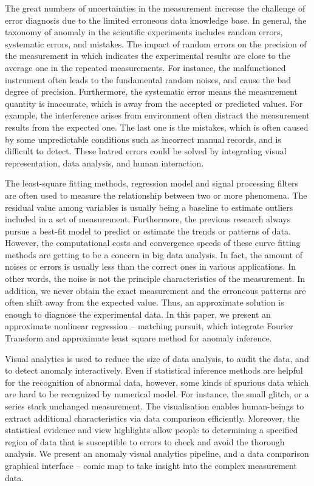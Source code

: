 \documentclass{vgtc}                          %
\begin{document}
	The great numbers of uncertainties in the measurement increase the challenge of error diagnosis due to the limited erroneous data knowledge base. In general, the taxonomy of anomaly in the scientific experiments includes random errors, systematic errors, and mistakes. The impact of random errors on the precision of the measurement in which indicates the experimental results are close to the average one in the repeated measurements. For instance, the malfunctioned instrument often leads to the fundamental random noises, and cause the bad degree of precision. Furthermore, the systematic error means the measurement quantity is inaccurate, which is away from the accepted or predicted values. For example, the interference arises from environment often distract the measurement results from the expected one. The last one is the mistakes, which is often caused by some unpredictable conditions such as incorrect manual records, and is difficult to detect. These hatred errors could be solved by integrating visual representation, data analysis, and human interaction.

	
	The least-square fitting methods, regression model and signal processing filters are often used to measure the relationship between two or more phenomena. The residual value among variables is usually being a baseline to estimate outliers included in a set of measurement. Furthermore, the previous research always pursue a best-fit model to predict or estimate the trends or patterns of data. However, the computational costs and convergence speeds of these curve fitting methods are getting to be a concern in big data analysis. In fact, the amount of noises or errors is usually less than the correct ones in various applications. In other words, the noise is not the principle characteristics of the measurement. In addition, we never obtain the exact measurement and the erroneous patterns are often shift away from the expected value. Thus, an approximate solution is enough to diagnose the experimental data. In this paper, we present an approximate nonlinear regression -- matching pursuit, which integrate Fourier Transform and approximate least square method for anomaly inference.

	Visual analytics is used to reduce the size of data analysis, to audit the data, and to detect anomaly interactively. Even if statistical inference methods are helpful for the recognition of abnormal data, however, some kinds of spurious data which are hard to be recognized by numerical model. For instance, the small glitch, or a series stark unchanged measurement. The visualisation enables human-beings to extract additional characteristics via data comparison efficiently. Moreover, the statistical evidence and view highlights allow people to determining a specified region of data that is susceptible to errors to check and avoid the thorough analysis. We present an anomaly visual analytics pipeline, and a data comparison graphical interface -- comic map to take insight into the complex measurement data.
	
\end{document}
